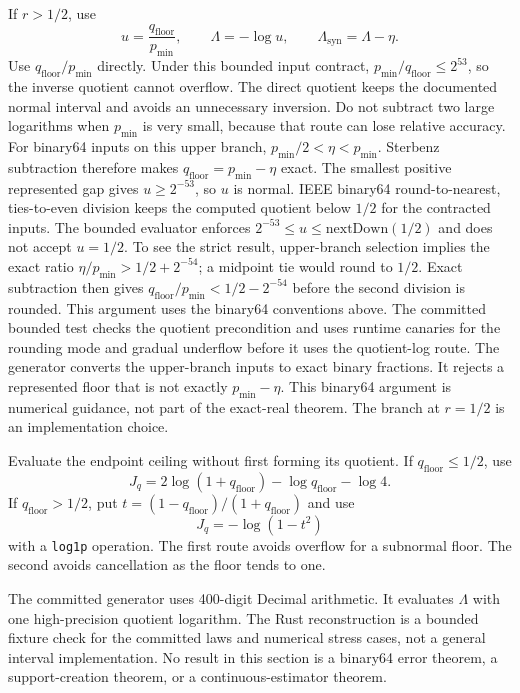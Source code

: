 \documentclass[11pt]{article}
\theoremstyle{definition}
\begin{document}
If $r>1/2$, use
\begin{equation}
  u
  =
  \frac{q_{\mathrm{floor}}}{p_{\min}},
  \qquad
  \Lambda
  =
  -\log u,
  \qquad
  \Lambda_{\mathrm{syn}}=\Lambda-\eta.
\end{equation}
Use $q_{\mathrm{floor}}/p_{\min}$ directly.  Under this bounded input contract,
$p_{\min}/q_{\mathrm{floor}}\le2^{53}$, so the inverse quotient cannot overflow.  The direct
quotient keeps the documented normal interval and avoids an unnecessary inversion.  Do not
subtract two large logarithms when $p_{\min}$ is very small, because that route can lose relative
accuracy.  For binary64 inputs on this upper branch, $p_{\min}/2<\eta<p_{\min}$.  Sterbenz
subtraction therefore makes $q_{\mathrm{floor}}=p_{\min}-\eta$ exact.  The smallest positive
represented gap gives $u\ge2^{-53}$, so $u$ is normal.  IEEE binary64 round-to-nearest,
ties-to-even division keeps the computed quotient below $1/2$ for the contracted inputs.  The
bounded evaluator enforces
$2^{-53}\le u\le\mathrm{nextDown}(1/2)$ and does not accept $u=1/2$.  To see the strict
result, upper-branch selection implies the exact ratio $\eta/p_{\min}>1/2+2^{-54}$; a midpoint tie
would round to $1/2$.  Exact subtraction then gives
$q_{\mathrm{floor}}/p_{\min}<1/2-2^{-54}$ before the second division is rounded.  This argument
uses the binary64 conventions above.  The committed bounded test checks the quotient precondition
and uses runtime canaries for the rounding mode and gradual underflow before it uses the
quotient-log route.  The generator converts the upper-branch inputs to exact binary fractions.  It
rejects a represented floor that is not exactly
$p_{\min}-\eta$.  This binary64 argument is numerical guidance, not part of the exact-real theorem.
The branch at $r=1/2$ is an implementation choice.

Evaluate the endpoint ceiling without first forming its quotient.  If
$q_{\mathrm{floor}}\le1/2$, use
\begin{equation}
  J_q
  =
  2\log(1+q_{\mathrm{floor}})
  -\log q_{\mathrm{floor}}
  -\log4.
\end{equation}
If $q_{\mathrm{floor}}>1/2$, put
$t=(1-q_{\mathrm{floor}})/(1+q_{\mathrm{floor}})$ and use
\begin{equation}
  J_q=-\log(1-t^2)
\end{equation}
with a \texttt{log1p} operation.  The first route avoids overflow for a subnormal floor.  The
second avoids cancellation as the floor tends to one.

The committed generator uses 400-digit Decimal arithmetic.  It evaluates $\Lambda$ with one
high-precision quotient logarithm.  The Rust reconstruction is a bounded
fixture check for the committed laws and numerical stress cases, not a general interval
implementation.
No result in this section is a binary64 error theorem, a support-creation theorem, or a
continuous-estimator theorem.
\end{document}
